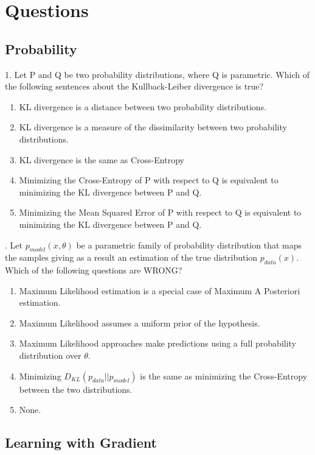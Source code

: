 \chapter{Questions}

\section{Probability}

1. Let P and Q be two probability distributions, where Q is parametric. Which of the following sentences about the Kullback-Leiber divergence is true?

\begin{enumerate}[label=\roman*]
    \item KL divergence is a distance between two probability distributions.
    \item KL divergence is a measure of the dissimilarity between two probability distributions.
    \item KL divergence is the same as Cross-Entropy
    \item Minimizing the Cross-Entropy of P with respect to Q is equivalent to minimizing the KL divergence between P and Q.
    \item Minimizing the Mean Squared Error of P with respect to Q is equivalent to minimizing the KL divergence between P and Q.
\end{enumerate}

. Let $ p_{model} (x, \theta)$ be a parametric family of probability distribution that maps the samples giving as a result an estimation of the true distribution $p_{data} (x)$. Which of the following questions are WRONG?

\begin{enumerate}[label=\roman*]
    \item Maximum Likelihood estimation is a special case of Maximum A Posteriori estimation.
    \item Maximum Likelihood assumes a uniform prior of the hypothesis.
    \item Maximum Likelihood approaches make predictions using a full probability distribution over $\theta$.
    \item Minimizing $D_{KL} (p_{data} || p_{model})$ is the same as minimizing the Cross-Entropy between the two distributions.
    \item None.
\end{enumerate}

\section{Learning with Gradient}

